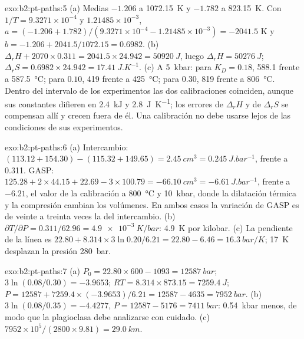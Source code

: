 \begin{solution}{exo:b2:pt-paths:5}
(a) Medias $-1.206$ a \qty{1072.15}{K} y $-1.782$ a \qty{823.15}{K}. Con $1/T =
9.3271\times10^{-4}$ y $1.21485\times10^{-3}$, $a = (-1.206 + 1.782)/(9.3271\times10^{-4}
- 1.21485\times10^{-3}) = -2041.5$ K y $b = -1.206 + 2041.5/1072.15 = 0.6982$.
(b) $\Delta_r H + 2070\times0.311 = 2041.5\times24.942 = \qty{50920}{J}$, luego $\Delta_r H =
\qty{50276}{J}$; $\Delta_r S = 0.6982\times24.942 = \qty{17.41}{J.K^{-1}}$. (c) A
\qty{5}{kbar}: para $K_D = 0.18$, 588.1 frente a \qty{587.5}{\celsius}; para $0.10$, 419
frente a \qty{425}{\celsius}; para $0.30$, 819 frente a \qty{806}{\celsius}. Dentro del intervalo
de los experimentos las dos calibraciones coinciden, aunque sus constantes difieren en
\qty{2.4}{kJ} y \qty{2.8}{J.K^{-1}}; los errores de $\Delta_r H$ y de $\Delta_r S$
se compensan allí y crecen fuera de él. Una calibración no debe usarse lejos
de las condiciones de sus experimentos.
\end{solution}

\begin{solution}{exo:b2:pt-paths:6}
(a) Intercambio: $(113.12 + 154.30) - (115.32 + 149.65) = \qty{+2.45}{cm^3} =
\qty{0.245}{J.bar^{-1}}$, frente a 0.311. GASP: $125.28 + 2\times44.15 + 22.69 -
3\times100.79 = \qty{-66.10}{cm^3} = \qty{-6.61}{J.bar^{-1}}$, frente a $-6.21$, el valor
de la calibración a \qty{800}{\celsius} y \qty{10}{kbar}, donde la dilatación térmica y la
compresión cambian los volúmenes. En ambos casos la variación de GASP es de veinte a treinta veces
la del intercambio. (b) $\partial T/\partial P = 0.311/62.96 = \qty{4.9e-3}{K/bar}$:
\qty{4.9}{K} por kilobar. (c) La pendiente de la línea es $22.80 + 8.314\times3\ln 0.20/6.21
= 22.80 - 6.46 = \qty{16.3}{bar/K}$; \qty{17}{K} desplazan la presión
\qty{280}{bar}.
\end{solution}

\begin{solution}{exo:b2:pt-paths:7}
(a) $P_0 = 22.80\times600 - 1093 = \qty{12587}{bar}$; $3\ln(0.08/0.30) = -3.9653$; $RT =
8.314\times873.15 = \qty{7259.4}{J}$; $P = 12587 + 7259.4\times(-3.9653)/6.21 = 12587 -
4635 = \qty{7952}{bar}$. (b) $3\ln(0.08/0.35) = -4.4277$, $P = 12587 - 5176 =
\qty{7411}{bar}$: \qty{0.54}{kbar} menos, de modo que la plagioclasa debe analizarse con cuidado.
(c) $7952\times10^5/(2800\times9.81) = \qty{29.0}{km}$.
\end{solution}

